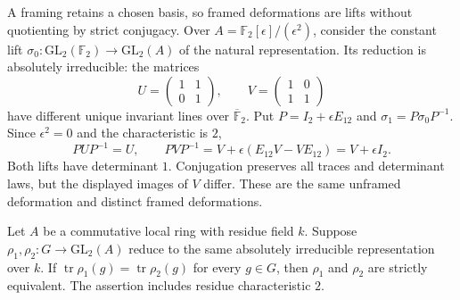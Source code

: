 A framing retains a chosen basis, so framed deformations are lifts
without quotienting by strict conjugacy. Over
$A=\mathbb F_2[\epsilon]/(\epsilon^2)$, consider the constant lift
$\sigma_0:\mathrm{GL}_2(\mathbb F_2)\to\mathrm{GL}_2(A)$ of the
natural representation. Its reduction is absolutely irreducible:
the matrices
\[
 U=\begin{pmatrix}1&1\\0&1\end{pmatrix},\qquad
 V=\begin{pmatrix}1&0\\1&1\end{pmatrix}
\]
have different unique invariant lines over $\overline{\mathbb F}_2$.
Put $P=I_2+\epsilon E_{12}$ and $\sigma_1=P\sigma_0P^{-1}$.
Since $\epsilon^2=0$ and the characteristic is $2$,
\[
 PUP^{-1}=U,\qquad
 PVP^{-1}=V+\epsilon(E_{12}V-VE_{12})=V+\epsilon I_2.
\]
Both lifts have determinant $1$. Conjugation preserves all traces and
determinant laws, but the displayed images of $V$ differ.
These are the same unframed deformation and distinct framed deformations.

\begin{lemma}
\label{v4-arith:w10-e:trace-conjugacy}
Let $A$ be a commutative local ring with residue field $k$.
Suppose $\rho_1,\rho_2:G\to\mathrm{GL}_2(A)$ reduce to the same
absolutely irreducible representation over $k$.
If $\operatorname{tr}\rho_1(g)=\operatorname{tr}\rho_2(g)$ for every
$g\in G$, then $\rho_1$ and $\rho_2$ are strictly equivalent.
The assertion includes residue characteristic $2$.
\end{lemma}

